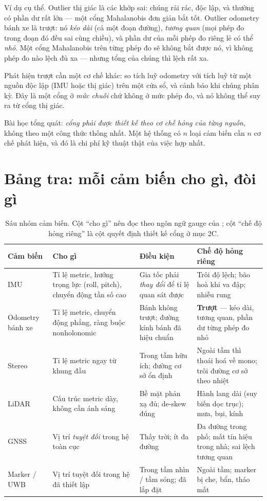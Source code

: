 \documentclass[../../vslam.tex]{subfiles}
\begin{document}
Ví dụ cụ thể. Outlier thị giác là các khớp sai: chúng rải rác, độc lập, và thường có phần dư rất lớn --- một cổng Mahalanobis đơn giản bắt tốt. Outlier odometry bánh xe là trượt: nó \emph{kéo dài} (cả một đoạn đường), \emph{tương quan} (mọi phép đo trong đoạn đó đều sai cùng chiều), và phần dư của mỗi phép đo riêng lẻ có thể \emph{nhỏ}. Một cổng Mahalanobis trên từng phép đo sẽ không bắt được nó, vì không phép đo nào lệch đủ xa --- nhưng tổng của chúng thì lệch rất xa.

Phát hiện trượt cần một cơ chế khác: so tích luỹ odometry với tích luỹ từ một nguồn độc lập (IMU hoặc thị giác) trên một cửa sổ, và cảnh báo khi chúng phân kỳ. Đây là một cổng ở \emph{mức chuỗi} chứ không ở mức phép đo, và nó không thể suy ra từ cổng thị giác.

Bài học tổng quát: \emph{cổng phải được thiết kế theo cơ chế hỏng của từng nguồn}, không theo một công thức thống nhất. Một hệ thống có \(n\) loại cảm biến cần \(n\) cơ chế phát hiện, và đó là chi phí kỹ thuật thật của việc hợp nhất.

\section{Bảng tra: mỗi cảm biến cho gì, đòi gì}

\begin{table}[H]\centering\small
\caption{Sáu nhóm cảm biến. Cột ``cho gì'' nên đọc theo ngôn ngữ gauge của ; cột ``chế độ hỏng riêng'' là cột quyết định thiết kế cổng ở mục 2C.}
\label{tab:c15-sensors}
\begin{tabularx}{\linewidth}{@{}L{2.1cm}L{3.0cm}L{3.1cm}Y@{}}
\toprule
\textbf{Cảm biến} & \textbf{Cho gì} & \textbf{Điều kiện} & \textbf{Chế độ hỏng riêng}\\
\midrule
IMU & Tỉ lệ metric, hướng trọng lực (roll, pitch), chuyển động tần số cao & Gia tốc phải \emph{thay đổi} để tỉ lệ quan sát được & Trôi độ lệch; bão hoà khi va đập; nhiễu rung\\
Odometry bánh xe & Tỉ lệ metric, chuyển động phẳng, ràng buộc nonholonomic & Bánh không trượt; đường kính bánh đã hiệu chuẩn & \textbf{Trượt} --- kéo dài, tương quan, phần dư từng phép đo nhỏ\\
Stereo & Tỉ lệ metric ngay từ khung đầu & Trong tầm hữu ích; đường cơ sở ổn định & Ngoài tầm thì thoái hoá về mono; trôi đường cơ sở theo nhiệt\\
LiDAR & Cấu trúc metric dày, không cần ánh sáng & Bề mặt phản xạ đủ; de-skew đúng & Hành lang dài (suy biến dọc trục); mưa, bụi, kính\\
GNSS & Vị trí \emph{tuyệt đối} trong hệ toàn cục & Thấy trời; ít đa đường & Đa đường trong phố; mất tín hiệu trong nhà; sai lệch tương quan\\
Marker / UWB & Vị trí tuyệt đối trong hệ đã thiết lập & Trong tầm nhìn / tầm sóng; đã lắp đặt & Ngoài tầm; marker bị che, bẩn, tháo mất\\
\bottomrule
\end{tabularx}
\end{table}
\end{document}
